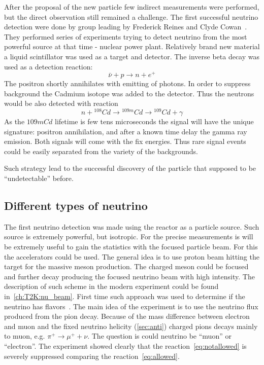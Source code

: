 \documentclass[../main.tex]{subfiles}
\begin{document}
After the proposal of the new particle few indirect measurements were performed, but the direct observation still remained a challenge. The first successful neutrino detection were done by group leading by Frederick Reines and Clyde Cowan~\cite{Cowan1956}. They performed series of experiments trying to detect neutrino from the most powerful source at that time - nuclear power plant. Relatively brand new material a liquid scintillator was used as a target and detector. The inverse beta decay was used as a detection reaction:
\begin{equation}
\bar{\nu}+p\to n+e^+
\end{equation}
The positron shortly annihilates with emitting of photons. In order to suppress background the Cadmium isotope was added to the detector. Thus the neutrons would be also detected with reaction
\begin{equation}
n+{}^{108}Cd\to{}^{109m}Cd\to{}^{109}Cd+\gamma
\end{equation}
As the ${109m}Cd$ lifetime is few tens microseconds the signal will have the unique signature: positron annihilation, and after a known time delay the gamma ray emission. Both signals will come with the fix energies. Thus rare signal events could be easily separated from the variety of the backgrounds.

Such strategy lead to the successful discovery of the particle that supposed to be ``undetectable'' before.

\subsection{Different types of neutrino}
\label{sec:dublet}
The first neutrino detection was made using the reactor as a particle source. Such source is extremely powerful, but isotropic. For the precise measurements is will be extremely useful to gain the statistics with the focused particle beam. For this the accelerators could be used. The general idea is to use proton beam hitting the target for the massive meson production. The charged meson could be focused and further decay producing the focused neutrino beam with high intensity. The description of such scheme in the modern experiment could be found in~\autoref{ch:T2K:nu_beam}. First time such approach was used to determine if the neutrino has flavors~\cite{Danby1962}. The main idea of the experiment is to use the neutrino flux produced from the pion decay. Because of the mass difference between electron and muon and the fixed neutrino helicity (\autoref{sec:anti}) charged pions decays mainly to muon, e.g. $\pi^+\to\mu^++\nu$. The question is could neutrino be ``muon'' or ``electron''. The experiment showed clearly that the reaction~\autoref{eq:notallowed} is severely suppressed comparing the reaction~\autoref{eq:allowed}.
\end{document}
